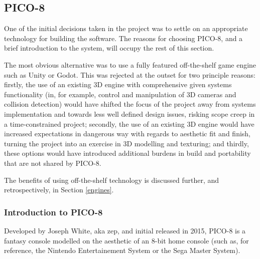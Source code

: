 \documentclass[11pt]{article}
\begin{document}
\subsection{PICO-8}\label{pico}


One of the initial decisions taken in the project was to settle on an appropriate technology
for building the software. The reasons for choosing PICO-8, and a brief introduction to the
system, will occupy the rest of this section.

The most obvious alternative was to use a fully featured off-the-shelf game engine such as
Unity or Godot. This was rejected at the outset for two principle reasons: firstly, the
use of an existing 3D engine with comprehensive given systems functionality (in, for example,
control and manipulation of 3D cameras and collision detection) would have shifted the focus
of the project away from systems implementation and towards less well defined design issues,
risking scope creep in a time-constrained project; secondly, the use of an existing 3D engine
would have increased expectations in dangerous way with regards to aesthetic fit and finish,
turning the project into an exercise in 3D modelling and texturing; and thirdly, these options 
would have introduced additional burdens in build and portability that are not shared by PICO-8.

The benefits of using off-the-shelf technology is discussed further, and retrospectively, in
Section \ref{engines}.

\subsubsection*{Introduction to PICO-8}

Developed by Joseph White, aka zep, and initial released in 2015, PICO-8 is a 
fantasy console modelled on the aesthetic of an 8-bit home console (such as,
for reference, the Nintendo Entertainement System or the Sega Master System).
\end{document}
